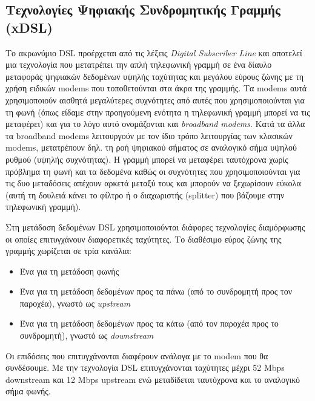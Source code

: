 %
%
\setcounter{subsection}{3}
\subsection{Τεχνολογίες Ψηφιακής Συνδρομητικής Γραμμής (xDSL)}

Το ακρωνύμιο DSL προέρχεται από τις λέξεις \emph{Digital Subscriber Line} και αποτελεί μια τεχνολογία που μετατρέπει την απλή τηλεφωνική γραμμή σε ένα δίαυλο μεταφοράς ψηφιακών δεδομένων υψηλής ταχύτητας και μεγάλου εύρους ζώνης με τη χρήση ειδικών modems που τοποθετούνται στα άκρα της γραμμής. Τα modems αυτά χρησιμοποιούν αισθητά μεγαλύτερες συχνότητες από αυτές που χρησιμοποιούνται για τη φωνή (όπως είδαμε στην προηγούμενη ενότητα  η τηλεφωνική γραμμή μπορεί να τις μεταφέρει) και για το λόγο αυτό ονομάζονται και \emph{broadband modems}. Κατά τα άλλα τα broadband modems  λειτουργούν με τον ίδιο τρόπο λειτουργίας των κλασικών modems, μετατρέπουν δηλ. τη ροή ψηφιακού σήματος  σε αναλογικό σήμα υψηλού ρυθμού (υψηλής συχνότητας). Η γραμμή μπορεί να μεταφέρει ταυτόχρονα χωρίς πρόβλημα τη φωνή και τα δεδομένα καθώς οι συχνότητες που χρησιμοποιούνται για τις δυο μεταδόσεις απέχουν αρκετά μεταξύ τους και μπορούν να ξεχωρίσουν εύκολα (αυτή τη δουλειά κάνει το φίλτρο ή ο διαχωριστής (splitter) που βάζουμε στην τηλεφωνική γραμμή).

Στη μετάδοση δεδομένων DSL χρησιμοποιούνται διάφορες τεχνολογίες διαμόρφωσης οι οποίες επιτυγχάνουν διαφορετικές ταχύτητες. Το διαθέσιμο εύρος ζώνης της γραμμής χωρίζεται σε τρία κανάλια:

\begin{itemize}
\item Ένα για τη μετάδοση φωνής
\item Ένα για τη μετάδοση δεδομένων προς τα πάνω (από το συνδρομητή προς τον παροχέα), γνωστό ως \emph{upstream}
\item Ένα για τη μετάδοση δεδομένων προς τα κάτω (από τον παροχέα προς το συνδρομητή), γνωστό ως \emph{downstream}
\end{itemize}

Οι επιδόσεις που επιτυγχάνονται διαφέρουν ανάλογα με το modem που θα συνδέσουμε. Με την τεχνολογία DSL επιτυγχάνονται ταχύτητες μέχρι 52 Mbps downstream και 12 Mbps upstream ενώ  μεταδίδεται ταυτόχρονα και το αναλογικό σήμα φωνής.


